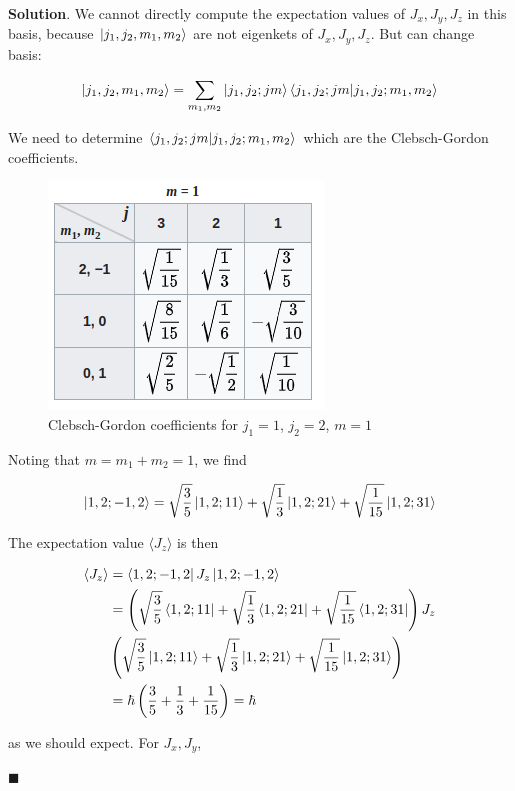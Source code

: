 \documentclass[12pt]{article}
\theoremstyle{definition}
\newenvironment{s}{%
        \begin{trivlist} \item \textbf{Solution}. }{%
            \hspace*{\fill} $\blacksquare$\end{trivlist}}%
\begin{document}
{\begin{s}
We cannot directly compute the expectation values of $J_x, J_y, J_z$ in this basis, because $\ket{j_1, j_2, m_1, m_2}$ are not eigenkets of $J_x, J_y, J_z$. But can change basis:

\begin{align*}
\ket{j_1, j_2, m_1, m_2} = \sum_{m_1,m_2} \ket{j_1,j_2; jm}\bra{j_1,j_2; jm}\ket{j_{1}, j_{2}; m_{1},m_{2}}
\end{align*}

We need to determine $\bra{j_1,j_2; jm}\ket{j_{1}, j_{2}; m_{1},m_{2}}$ which are the Clebsch-Gordon coefficients.

\begin{figure}
\centering
\includegraphics[scale=0.75]{cb-table.png}
\caption{Clebsch-Gordon coefficients for $j_{1} = 1$, $j_{2} = 2$, $m=1$}
\end{figure}

Noting that $m = m_1 + m_2 = 1$, we find

\begin{align*}
\ket{1,2;-1,2} = \sqrt{\frac{3}{5}}\ket{1,2;1 1} + \sqrt{\frac{1}{3}}\ket{1,2;2 1} + \sqrt{\frac{1}{15}}\ket{1,2;3 1}
\end{align*}

The expectation value $\langle J_z \rangle$ is then

\begin{align*}
\langle J_z \rangle &= \bra{1,2;-1,2} J_z \ket{1,2;-1,2} \\
&= \left(\sqrt{\frac{3}{5}}\bra{1,2;1 1} + \sqrt{\frac{1}{3}}\bra{1,2;2 1} + \sqrt{\frac{1}{15}}\bra{1,2;3 1}\right)J_{z}\\
&\left(\sqrt{\frac{3}{5}}\ket{1,2;1 1} + \sqrt{\frac{1}{3}}\ket{1,2;2 1} + \sqrt{\frac{1}{15}}\ket{1,2;3 1}\right)\\
&= \hbar\left(\frac{3}{5}+\frac{1}{3}+\frac{1}{15}\right) = \hbar
\end{align*}

as we should expect. For $J_x, J_y$, 


\end{s}}
\end{document}
